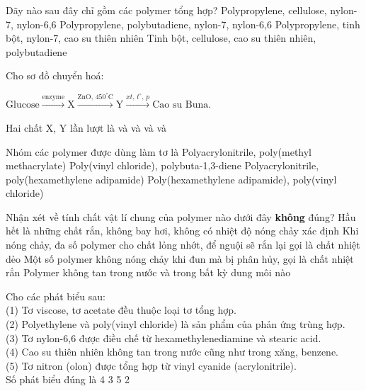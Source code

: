 \documentclass[11pt,a4paper]{article}
\def\loigiai#1{}
\begin{document}
\begin{ex}
Dãy nào sau đây chỉ gồm các polymer tổng hợp?
\choice
{Polypropylene, cellulose, nylon-7, nylon-6,6}
{Polypropylene, polybutadiene, nylon-7, nylon-6,6}
{Polypropylene, tinh bột, nylon-7, cao su thiên nhiên}
{Tinh bột, cellulose, cao su thiên nhiên, polybutadiene}
\loigiai{}
\end{ex}

\begin{ex}
Cho sơ đồ chuyển hoá:
\centerline{$\text{Glucose} \xrightarrow{\text{enzyme}} \text{X} \xrightarrow{\text{ZnO},\, 450^\circ\text{C}} \text{Y} \xrightarrow{xt,\, t^\circ,\, p} \text{Cao su Buna.}$}
Hai chất X, Y lần lượt là
\choice
{ và }
{ và }
{ và }
{ và }
\loigiai{}
\end{ex}

\begin{ex}
Nhóm các polymer được dùng làm tơ là
\choice
{Polyacrylonitrile, poly(methyl methacrylate)}
{Poly(vinyl chloride), polybuta-1,3-diene}
{Polyacrylonitrile, poly(hexamethylene adipamide)}
{Poly(hexamethylene adipamide), poly(vinyl chloride)}
\loigiai{}
\end{ex}

\begin{ex}
Nhận xét về tính chất vật lí chung của polymer nào dưới đây \textbf{không} đúng?
\choice
{Hầu hết là những chất rắn, không bay hơi, không có nhiệt độ nóng chảy xác định}
{Khi nóng chảy, đa số polymer cho chất lỏng nhớt, để nguội sẽ rắn lại gọi là chất nhiệt dẻo}
{Một số polymer không nóng chảy khi đun mà bị phân hủy, gọi là chất nhiệt rắn}
{Polymer không tan trong nước và trong bất kỳ dung môi nào}
\loigiai{}
\end{ex}

\begin{ex}
Cho các phát biểu sau:\\
(1) Tơ viscose, tơ acetate đều thuộc loại tơ tổng hợp.\\
(2) Polyethylene và poly(vinyl chloride) là sản phẩm của phản ứng trùng hợp.\\
(3) Tơ nylon-6,6 được điều chế từ hexamethylenediamine và stearic acid.\\
(4) Cao su thiên nhiên không tan trong nước cũng như trong xăng, benzene.\\
(5) Tơ nitron (olon) được tổng hợp từ vinyl cyanide (acrylonitrile).\\
Số phát biểu đúng là
\choice
{4}
{3}
{5}
{2}
\loigiai{}
\end{ex}
\end{document}
